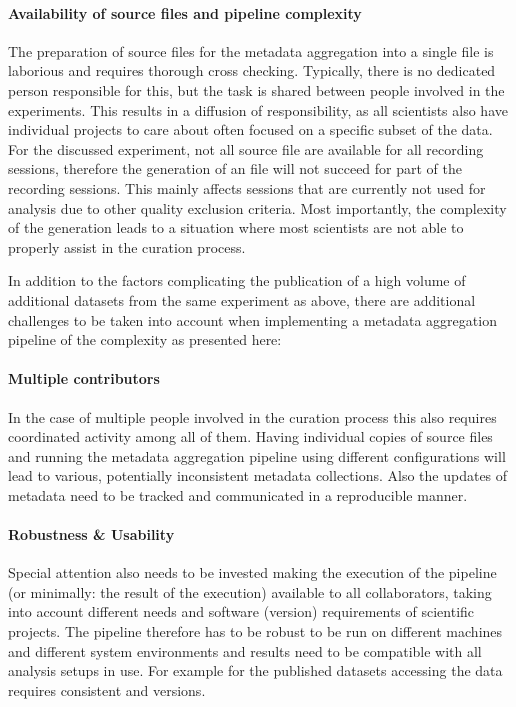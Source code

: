 \paragraph{Availability of source files and pipeline complexity}
The preparation of source files for the metadata aggregation into a single  file is laborious and requires thorough cross checking. Typically, there is no dedicated person responsible for this, but the task is shared between people involved in the experiments. This results in a diffusion of responsibility, as all scientists also have individual projects to care about often focused on a specific subset of the data. For the discussed experiment, not all source file are available for all recording sessions, therefore the generation of an  file will not succeed for part of the recording sessions. This mainly affects sessions that are currently not used for analysis due to other quality exclusion criteria. Most importantly, the complexity of the  generation leads to a situation where most scientists are not able to properly assist in the curation process.
\newline

In addition to the factors complicating the publication of a high volume of additional datasets from the same experiment as above, there are additional challenges to be taken into account when implementing a metadata aggregation pipeline of the complexity as presented here:

\paragraph{Multiple contributors}
In the case of multiple people involved in the curation process this also requires coordinated activity among all of them. Having individual copies of source files and running the metadata aggregation pipeline using different configurations will lead to various, potentially inconsistent metadata collections. Also the updates of metadata need to be tracked and communicated in a reproducible manner.

\paragraph{Robustness \& Usability}
Special attention also needs to be invested making the execution of the pipeline (or minimally: the result of the execution) available to all collaborators, taking into account different needs and software (version) requirements of scientific projects. The pipeline therefore has to be robust to be run on different machines and different system environments and results need to be compatible with all analysis setups in use. For example for the published datasets accessing the data requires consistent  and  versions.


